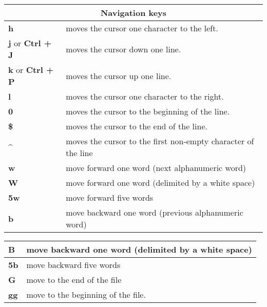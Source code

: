 \begin{table}[h]
\centering
\footnotesize
\begin{tabular}{|l|l|}
\multicolumn{2}{c}{\textbf{Navigation keys}}\\
\hline
\textbf{h}	& {moves the cursor one character to the left.}\\
\hline
{\textbf{j} or\textbf{ Ctrl + J}}	& {moves the cursor down one line.}\\
\hline
{\textbf{k} or \textbf{Ctrl + P}}	& {moves the cursor up one line.}\\
\hline
\textbf{l}  & {moves the cursor one character to the right.}\\
\hline
\textbf{0}	& {moves the cursor to the beginning of the line.}\\
\hline
\textbf{\$}	& {moves the cursor to the end of the line.}\\
\hline
\textbf{\^}	& {moves the cursor to the first non-empty character of the line}\\
\hline
\textbf{w}	& {move forward one word (next alphanumeric word)}\\
\hline
\textbf{W}	& {move forward one word (delimited by a white space)}\\
\hline
\textbf{5w}	& {move forward five words}\\
\hline
\textbf{b}	& {move backward one word (previous alphanumeric word)}\\
\hline
\end{tabular}
\end{table}
\begin{table}[h]
\centering
\footnotesize
\begin{tabular}{|l|l|}
\hline
\textbf{B}	& {move backward one word (delimited by a white space)}\\
\hline
\textbf{5b}	& {move backward five words}\\
\hline
\textbf{G}	& {move to the end of the file}\\
\hline
\textbf{gg}	& {move to the beginning of the file.}\\
\hline
\end{tabular}
\end{table}


